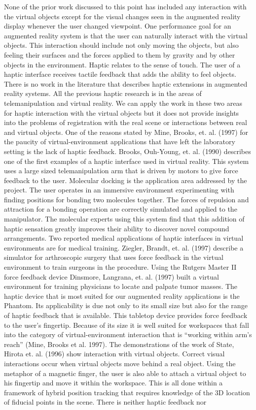None of the prior work discussed to this point has included any interaction with the virtual objects except for the visual changes seen in the augmented reality display whenever the user changed viewpoint. One performance goal for an augmented reality system is that the user can naturally interact with the virtual objects. This interaction should include not only moving the objects, but also feeling their surfaces and the forces applied to them by gravity and by other objects in the environment. Haptic relates to the sense of touch. The user of a haptic interface receives tactile feedback that adds the ability to feel objects. There is no work in the literature that describes haptic extensions in augmented reality systems. All the previous haptic research is in the areas of telemanipulation and virtual reality. We can apply the work in these two areas for haptic interaction with the virtual objects but it does not provide insights into the problems of registration with the real scene or interactions between real and virtual objects. One of the reasons stated by Mine, Brooks, et. al. (1997) for the paucity of virtual-environment applications that have left the laboratory setting is the lack of haptic feedback. Brooks, Ouh-Young, et. al. (1990) describes one of the first examples of a haptic interface used in virtual reality. This system uses a large sized telemanipulation arm that is driven by motors to give force feedback to the user. Molecular docking is the application area addressed by the project. The user operates in an immersive environment experimenting with finding positions for bonding two molecules together. The forces of repulsion and attraction for a bonding operation are correctly simulated and applied to the manipulator. The molecular experts using this system find that this addition of haptic sensation greatly improves their ability to discover novel compound arrangements. Two reported medical applications of haptic interfaces in virtual environments are for medical training. Ziegler, Brandt, et. al. (1997) describe a simulator for arthroscopic surgery that uses force feedback in the virtual environment to train surgeons in the procedure. Using the Rutgers Master II force feedback device Dinsmore, Langrana, et. al. (1997) built a virtual environment for training physicians to locate and palpate tumor masses. The haptic device that is most suited for our augmented reality applications is the Phantom. Its applicability is due not only to its small size but also for the range of haptic feedback that is available. This tabletop device provides force feedback to the user’s fingertip. Because of its size it is well suited for workspaces that fall into the category of virtual-environment interaction that is “working within arm’s reach” (Mine, Brooks et al. 1997). The demonstrations of the work of State, Hirota et. al. (1996) show interaction with virtual objects. Correct visual interactions occur when virtual objects move behind a real object. Using the metaphor of a magnetic finger, the user is also able to attach a virtual object to his fingertip and move it within the workspace. This is all done within a framework of hybrid position tracking that requires knowledge of the 3D location of fiducial points in the scene. There is neither haptic feedback nor 
